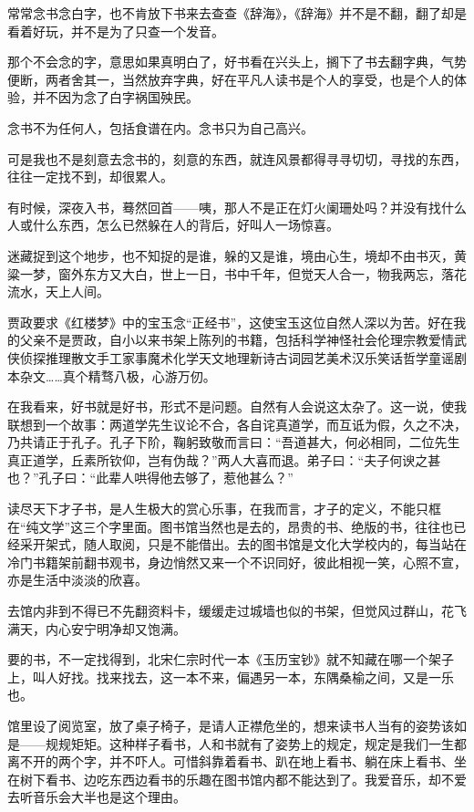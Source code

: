 \par 常常念书念白字，也不肯放下书来去查查《辞海》，《辞海》并不是不翻，翻了却是看着好玩，并不是为了只查一个发音。
\par 那个不会念的字，意思如果真明白了，好书看在兴头上，搁下了书去翻字典，气势便断，两者舍其一，当然放弃字典，好在平凡人读书是个人的享受，也是个人的体验，并不因为念了白字祸国殃民。
\par 念书不为任何人，包括食谱在内。念书只为自己高兴。
\par 可是我也不是刻意去念书的，刻意的东西，就连风景都得寻寻切切，寻找的东西，往往一定找不到，却很累人。
\par 有时候，深夜入书，蓦然回首——咦，那人不是正在灯火阑珊处吗？并没有找什么人或什么东西，怎么已然躲在人的背后，好叫人一场惊喜。
\par 迷藏捉到这个地步，也不知捉的是谁，躲的又是谁，境由心生，境却不由书灭，黄粱一梦，窗外东方又大白，世上一日，书中千年，但觉天人合一，物我两忘，落花流水，天上人间。
\par 贾政要求《红楼梦》中的宝玉念“正经书”，这使宝玉这位自然人深以为苦。好在我的父亲不是贾政，自小以来书架上陈列的书籍，包括科学神怪社会伦理宗教爱情武侠侦探推理散文手工家事魔术化学天文地理新诗古词园艺美术汉乐笑话哲学童谣剧本杂文……真个精骛八极，心游万仞。
\par 在我看来，好书就是好书，形式不是问题。自然有人会说这太杂了。这一说，使我联想到一个故事：两道学先生议论不合，各自诧真道学，而互诋为假，久之不决，乃共请正于孔子。孔子下阶，鞠躬致敬而言曰：“吾道甚大，何必相同，二位先生真正道学，丘素所钦仰，岂有伪哉？”两人大喜而退。弟子曰：“夫子何谀之甚也？”孔子曰：“此辈人哄得他去够了，惹他甚么？”
\par 读尽天下才子书，是人生极大的赏心乐事，在我而言，才子的定义，不能只框在“纯文学”这三个字里面。图书馆当然也是去的，昂贵的书、绝版的书，往往也已经采开架式，随人取阅，只是不能借出。去的图书馆是文化大学校内的，每当站在冷门书籍架前翻书观书，身边悄然又来一个不识同好，彼此相视一笑，心照不宣，亦是生活中淡淡的欣喜。
\par 去馆内非到不得已不先翻资料卡，缓缓走过城墙也似的书架，但觉风过群山，花飞满天，内心安宁明净却又饱满。
\par 要的书，不一定找得到，北宋仁宗时代一本《玉历宝钞》就不知藏在哪一个架子上，叫人好找。找来找去，这一本不来，偏遇另一本，东隅桑榆之间，又是一乐也。
\par 馆里设了阅览室，放了桌子椅子，是请人正襟危坐的，想来读书人当有的姿势该如是——规规矩矩。这种样子看书，人和书就有了姿势上的规定，规定是我们一生都离不开的两个字，并不吓人。可惜斜靠着看书、趴在地上看书、躺在床上看书、坐在树下看书、边吃东西边看书的乐趣在图书馆内都不能达到了。我爱音乐，却不爱去听音乐会大半也是这个理由。
